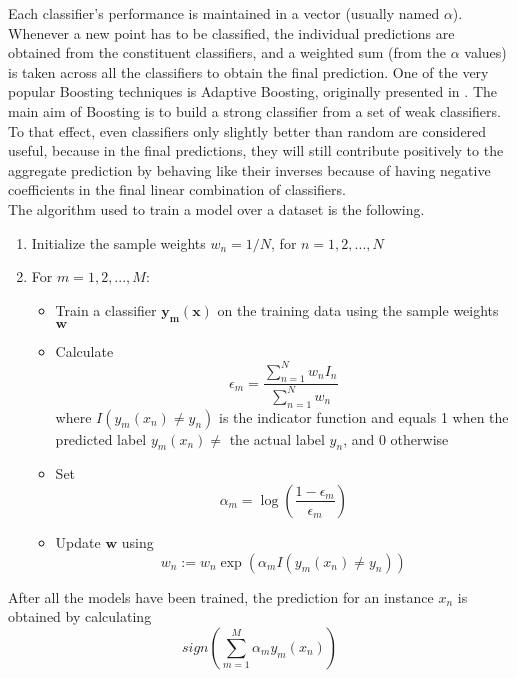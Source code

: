 Each classifier's performance is maintained in a vector (usually named $\alpha$). Whenever a new point has to be classified, the individual predictions are obtained from the constituent classifiers, and a weighted sum (from the $\alpha$ values) is taken across all the classifiers to obtain the final prediction. One of the very popular Boosting techniques is Adaptive Boosting, originally presented in \cite{freund1995desicion}. The main aim of Boosting is to build a strong classifier from a set of weak classifiers. To that effect, even classifiers only slightly better than random are considered useful, because in the final predictions, they will still contribute positively to the aggregate prediction by behaving like their inverses because of having negative coefficients in the final linear combination of classifiers.\\

The algorithm used to train a model over a dataset is the following.

\begin{enumerate}
    \item{Initialize the sample weights $w_n = 1/N$, for $n = 1, 2, ..., N$}
    \item{
    For $m = 1, 2, ..., M$:
    \begin{itemize}
        \item{Train a classifier $\mathbf{y_m(x)}$ on the training data using the sample weights $\mathbf{w}$}
        \item{Calculate $$\epsilon_m = \frac{\displaystyle \sum_{n = 1}^{N} w_n I_n}{\displaystyle \sum_{n = 1}^{N} w_n}$$ where $I(y_m(x_n) \neq y_n)$ is the indicator function and equals 1 when the predicted label $y_m(x_n) \neq$ the actual label $y_n$, and 0 otherwise}
        \item{Set $$\alpha_m = \log(\frac{1 - \epsilon_m}{\epsilon_m})$$}
        \item{Update $\mathbf{w}$ using $$w_n := w_n \exp(\alpha_m I(y_m(x_n) \neq y_n))$$}
    \end{itemize}
    }
\end{enumerate}

After all the models have been trained, the prediction for an instance $x_n$ is obtained by calculating $$sign(\displaystyle \sum_{m = 1}^{M} \alpha_m y_m(x_n))$$

